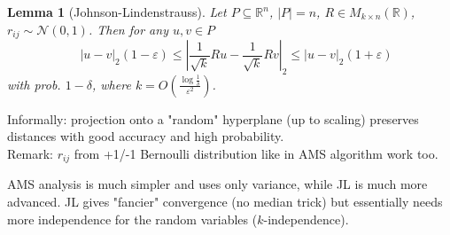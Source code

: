 \documentclass[11pt]{article}
\newtheorem{lemma}[theorem]{Lemma}
\begin{document}
\begin{lemma}[Johnson-Lindenstrauss]
Let $P \subseteq \mathbb{R}^n$, $|P| = n$, $R \in M_{k \times n}(\mathbb{R})$, $r_{ij} \sim \mathcal{N}(0, 1)$. Then for any $u,v \in P$
$$\quad |u-v|_2 (1 - \varepsilon) \leq \left| \frac{1}{\sqrt{k}}Ru - \frac{1}{\sqrt{k}} Rv \right|_2 \leq |u-v|_2 (1+\varepsilon)$$
with prob. $1-\delta$, where $k = O \left( \frac{\log{\frac{1}{\delta}}}{\varepsilon^2}\right)$.
\end{lemma}

Informally: projection onto a "random" hyperplane (up to scaling) preserves distances with good accuracy and high probability. \\
Remark: $r_{ij}$ from +1/-1 Bernoulli distribution like in AMS algorithm work too. \cite{DBLP:journals/jcss/Achlioptas03}

AMS analysis is much simpler and uses only variance, while JL is much more advanced. JL gives "fancier" convergence (no median trick) but essentially needs more independence for the random variables ($k$-independence).



\end{document}
